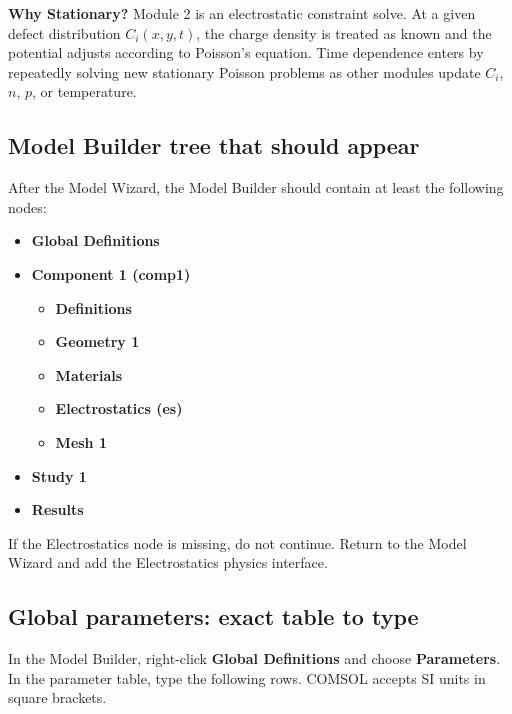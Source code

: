 \documentclass[11pt]{article}
\begin{document}
\begin{physicsbox}
\textbf{Why Stationary?} Module 2 is an electrostatic constraint solve. At a given defect distribution $C_i(x,y,t)$, the charge density is treated as known and the potential adjusts according to Poisson's equation. Time dependence enters by repeatedly solving new stationary Poisson problems as other modules update $C_i$, $n$, $p$, or temperature.
\end{physicsbox}

\subsection{Model Builder tree that should appear}

After the Model Wizard, the Model Builder should contain at least the following nodes:
\begin{itemize}[leftmargin=2em]
\item \textbf{Global Definitions}
\item \textbf{Component 1 (comp1)}
\begin{itemize}[leftmargin=1.5em]
\item \textbf{Definitions}
\item \textbf{Geometry 1}
\item \textbf{Materials}
\item \textbf{Electrostatics (es)}
\item \textbf{Mesh 1}
\end{itemize}
\item \textbf{Study 1}
\item \textbf{Results}
\end{itemize}
If the Electrostatics node is missing, do not continue. Return to the Model Wizard and add the Electrostatics physics interface.

\subsection{Global parameters: exact table to type}

In the Model Builder, right-click \textbf{Global Definitions} and choose \textbf{Parameters}. In the parameter table, type the following rows. COMSOL accepts SI units in square brackets.
\end{document}
